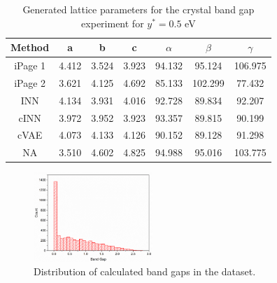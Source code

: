 \documentclass[letterpaper]{article} %
\begin{document}
\begin{table}[!h] 
\centering
\caption{Generated lattice parameters for the crystal band gap experiment for $y^*=0.5$ eV} 
\label{tab:crystal}
\begin{tabular}{@{}ccccccc@{}}
\toprule
Method    & a     & b     & c     & $\alpha$       & $\beta$       & $\gamma$       \\ \midrule
iPage 1   & 4.412 & 3.524 & 3.923 & 94.132  & 95.124  & 106.975 \\
iPage 2   & 3.621 & 4.125 & 4.692 & 85.133  & 102.299 & 77.432  \\
INN   & 4.134 & 3.931 & 4.016 & 92.728  & 89.834  & 92.207  \\
cINN  & 3.972 & 3.952 & 3.923 & 93.357  & 89.815  & 90.199  \\
cVAE  & 4.073 & 4.133 & 4.126 & 90.152  & 89.128  & 91.298  \\
NA    & 3.510 & 4.602 & 4.825 & 94.988  & 95.016  & 103.775 \\ \bottomrule
\end{tabular}
\end{table}

\begin{figure}[h!]
    \centering
    \includegraphics[width=0.4\textwidth]{crystal_dis.png}
    \caption{Distribution of calculated band gaps in the dataset.}
    \label{fig:crystal2}
\end{figure}
\end{document}
